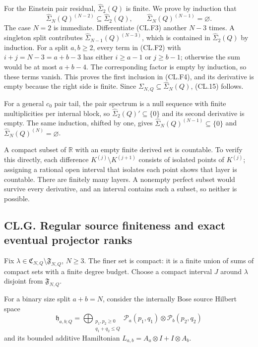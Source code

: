 \documentclass[a4paper,11pt]{article}
\numberwithin{equation}{section}
\begin{document}
For the Einstein pair residual, \(\widehat\Sigma_2(Q)\) is finite. We prove by induction that \[
\widehat\Sigma_N(Q)^{(N-2)}\subseteq\widehat\Sigma_2(Q),
\qquad
\widehat\Sigma_N(Q)^{(N-1)}=\varnothing.
\tag{CL.F4}
\] The case \(N=2\) is immediate. Differentiate (CL.F3) another \(N-3\) times. A singleton split contributes \(\widehat\Sigma_{N-1}(Q)^{(N-3)}\), which is contained in \(\widehat\Sigma_2(Q)\) by induction. For a split \(a,b\geq2\), every term in (CL.F2) with \(i+j=N-3=a+b-3\) has either \(i\geq a-1\) or \(j\geq b-1\); otherwise the sum would be at most \(a+b-4\). The corresponding factor is empty by induction, so these terms vanish. This proves the first inclusion in (CL.F4), and its derivative is empty because the right side is finite. Since \(\Sigma_{N,Q}\subseteq\widehat\Sigma_N(Q)\), (CL.15) follows.

For a general \(c_0\) pair tail, the pair spectrum is a null sequence with finite multiplicities per internal block, so \(\widehat\Sigma_2(Q)'\subseteq\{0\}\) and its second derivative is empty. The same induction, shifted by one, gives \(\widehat\Sigma_N(Q)^{(N-1)}\subseteq\{0\}\) and \(\widehat\Sigma_N(Q)^{(N)}=\varnothing\).

A compact subset of \(\mathbb R\) with an empty finite derived set is countable. To verify this directly, each difference \(K^{(j)}\setminus K^{(j+1)}\) consists of isolated points of \(K^{(j)}\); assigning a rational open interval that isolates each point shows that layer is countable. There are finitely many layers. A nonempty perfect subset would survive every derivative, and an interval contains such a subset, so neither is possible.

\hypertarget{cl.g.-regular-source-finiteness-and-exact-eventual-projector-ranks}{%
\subsection{CL.G. Regular source finiteness and exact eventual projector ranks}\label{cl.g.-regular-source-finiteness-and-exact-eventual-projector-ranks}}

Fix \(\lambda\in\mathfrak C_{N,Q}\setminus\mathfrak F_{N,Q}\), \(N\geq3\). The finer set is compact: it is a finite union of sums of compact sets with a finite degree budget. Choose a compact interval \(J\) around \(\lambda\) disjoint from \(\mathfrak F_{N,Q}\).

For a binary size split \(a+b=N\), consider the internally Bose source Hilbert space \[
\mathfrak h_{a,b;Q}
=\bigoplus_{\substack{p_1,p_2\geq0\\q_1+q_2\leq Q}}
\mathcal P_a(p_1,q_1)\otimes\mathcal P_b(p_2,q_2)
\] and its bounded additive Hamiltonian \(L_{a,b}=A_a\otimes I+I\otimes A_b\).
\end{document}
